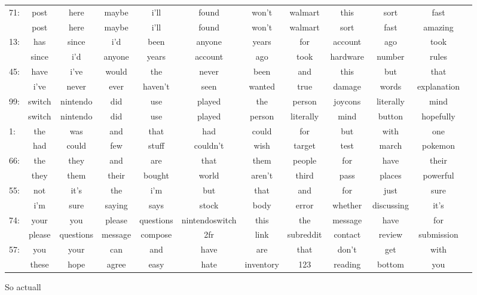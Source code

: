 \documentclass[11pt]{article} %
\begin{document}
\begin{landscape}
\begin{tabular}{|l|c c c c c c c c c c c}
71: &  post&here&maybe&i'll&found&won't&walmart&this&sort&fast\\
        & post&here&maybe&i'll&found&won't&walmart&sort&fast&amazing\\
13: &  has&since&i'd&been&anyone&years&for&account&ago&took\\
        & since&i'd&anyone&years&account&ago&took&hardware&number&rules\\
45: &  have&i've&would&the&never&been&and&this&but&that\\
        & i've&never&ever&haven't&seen&wanted&true&damage&words&explanation\\
99: &  switch&nintendo&did&use&played&the&person&joycons&literally&mind\\
        & switch&nintendo&did&use&played&person&literally&mind&button&hopefully\\
1: &  the&was&and&that&had&could&for&but&with&one\\
        & had&could&few&stuff&couldn't&wish&target&test&march&pokemon\\
66: &  the&they&and&are&that&them&people&for&have&their\\
        & they&them&their&bought&world&aren't&third&pass&places&powerful\\
55: &  not&it's&the&i'm&but&that&and&for&just&sure\\
        & i'm&sure&saying&says&stock&body&error&whether&discussing&it's\\
74: &  your&you&please&questions&nintendoswitch&this&the&message&have&for\\
        & please&questions&message&compose&2fr&link&subreddit&contact&review&submission\\
57: &  you&your&can&and&have&are&that&don't&get&with\\
        & these&hope&agree&easy&hate&inventory&123&reading&bottom&you\\

\end{tabular}
\end{landscape}
\restoregeometry

So actuall
\end{document}
